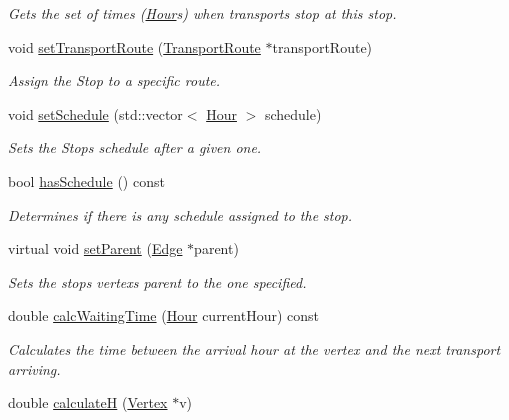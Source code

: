 \begin{DoxyCompactItemize}
\begin{DoxyCompactList}\small\item\em Gets the set of times (\hyperlink{class_hour}{Hour}\textquotesingle{}s) when transports stop at this stop. \end{DoxyCompactList}\item 
void \hyperlink{class_transport_stop_a3de4faae6f399f1c7e844f3b4aeb9f56}{set\+Transport\+Route} (\hyperlink{class_transport_route}{Transport\+Route} $\ast$transport\+Route)
\begin{DoxyCompactList}\small\item\em Assign the Stop to a specific route. \end{DoxyCompactList}\item 
void \hyperlink{class_transport_stop_acf542b1d06522bd3971fc8400df331b2}{set\+Schedule} (std\+::vector$<$ \hyperlink{class_hour}{Hour} $>$ schedule)
\begin{DoxyCompactList}\small\item\em Sets the Stop\textquotesingle{}s schedule after a given one. \end{DoxyCompactList}\item 
bool \hyperlink{class_transport_stop_ade8b9ee395616a37616d05e4cb7a0421}{has\+Schedule} () const 
\begin{DoxyCompactList}\small\item\em Determines if there is any schedule assigned to the stop. \end{DoxyCompactList}\item 
virtual void \hyperlink{class_transport_stop_a862190c81155a2aca27493d268a6c1d6}{set\+Parent} (\hyperlink{class_edge}{Edge} $\ast$parent)
\begin{DoxyCompactList}\small\item\em Sets the stop\textquotesingle{}s vertex\textquotesingle{}s parent to the one specified. \end{DoxyCompactList}\item 
double \hyperlink{class_transport_stop_ac8451eda14c724048a7afcab1dfb0d3d}{calc\+Waiting\+Time} (\hyperlink{class_hour}{Hour} current\+Hour) const 
\begin{DoxyCompactList}\small\item\em Calculates the time between the arrival hour at the vertex and the next transport arriving. \end{DoxyCompactList}\item 
double \hyperlink{class_transport_stop_a2cce3ec4e28f8952981d14d5913f058e}{calculate\+H} (\hyperlink{class_vertex}{Vertex} $\ast$v)

\end{DoxyCompactItemize}
